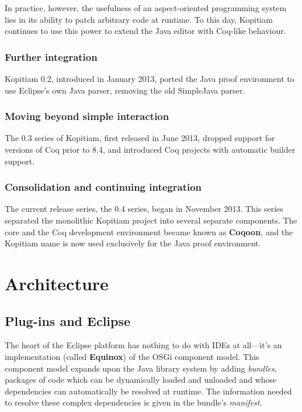 \documentclass{article}
\newcommand{\fdef}[1]{\textit{#1}}
\newcommand{\name}[1]{\textbf{#1}}
\begin{document}
In practice, however, the usefulness of an aspect-oriented programming system
lies in its ability to patch arbitrary code at runtime. To this day, Kopitiam
continues to use this power to extend the Java editor with Coq-like behaviour.

\subsubsection{Further integration}

Kopitiam 0.2, introduced in January 2013, ported the Java proof environment to
use Eclipse's own Java parser, removing the old SimpleJava parser.

\subsubsection{Moving beyond simple interaction}

The 0.3 series of Kopitiam, first released in June 2013, dropped support for
versions of Coq prior to 8.4, and introduced Coq projects with automatic
builder support.

\subsubsection{Consolidation and continuing integration}

The current release series, the 0.4 series, began in November 2013. This series
separated the monolithic Kopitiam project into several separate components. The
core and the Coq development environment became known as \name{Coqoon}, and
the Kopitiam name is now used exclusively for the Java proof environment.

\pagebreak

\section{Architecture}

\subsection{Plug-ins and Eclipse}

The heart of the Eclipse platform has nothing to do with IDEs at all---it's an
implementation (called \name{Equinox}) of the OSGi component model. This
component model expands upon the Java library system by adding \fdef{bundles},
packages of code which can be dynamically loaded and unloaded and whose
dependencies can automatically be resolved at runtime. The information needed
to resolve these complex dependencies is given in the bundle's \fdef{manifest}.
\end{document}
